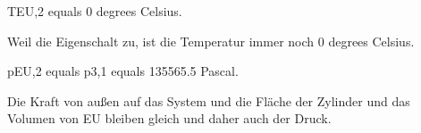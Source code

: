 TEU,2 equals 0 degrees Celsius.

Weil die Eigenschalt zu, ist die Temperatur immer noch 0 degrees Celsius.

pEU,2 equals p3,1 equals 135565.5 Pascal.

Die Kraft von außen auf das System und die Fläche der Zylinder und das Volumen von EU bleiben gleich und daher auch der Druck.